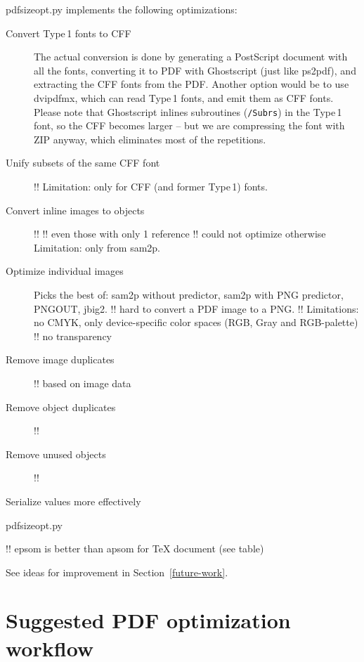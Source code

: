 \documentclass{ltugproc}
\def\cmd{\textsf}
\begin{document}
\cmd{pdfsizeopt.py} implements the following optimizations:

\begin{description}

\item[Convert Type\,1 fonts to CFF]
The actual conversion is done by generating a PostScript document with all
the fonts, converting it to PDF with Ghostscript (just like \cmd{ps2pdf}),
and extracting the CFF fonts from the PDF. Another option would be to use
\cmd{dvipdfmx}, which can read Type\,1 fonts, and emit them as CFF fonts.
Please note that Ghostscript inlines subroutines (\texttt{/Subrs}) in the
Type\,1 font, so the CFF becomes larger -- but we are compressing the font
with ZIP anyway, which eliminates most of the repetitions.

\item[Unify subsets of the same CFF font]
!!
Limitation: only for CFF (and former Type\,1) fonts.

\item[Convert inline images to objects]
!!
!! even those with only 1 reference
!! could not optimize otherwise
Limitation: only from sam2p.

\item[Optimize individual images]
Picks the best of: \cmd{sam2p} without predictor, \cmd{sam2p} with
PNG predictor, PNGOUT, \cmd{jbig2}.
!! hard to convert a PDF image to a PNG.
!! Limitations: no CMYK, only device-specific color spaces (RGB, Gray and
   RGB-palette)
!! no transparency

\item[Remove image duplicates]
!! based on image data

\item[Remove object duplicates]
!!

\item[Remove unused objects]
!!

\item[Serialize values more effectively]

\end{description}

\cmd{pdfsizeopt.py}

!! epsom is better than apsom for \TeX{} document (see table)

See ideas for improvement in Section~\ref{future-work}.

\section{Suggested PDF optimization workflow}\label{workflow}
\end{document}
